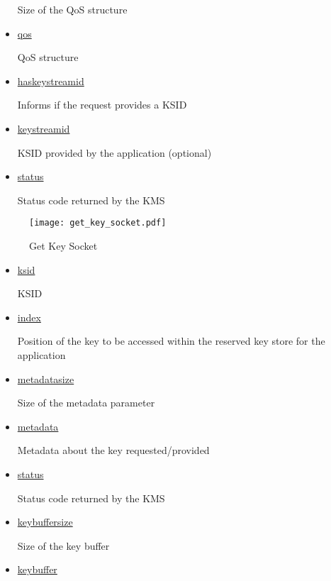 \begin{refsection}
\begin{itemize}
		Size of the QoS structure

	\item\underline{qos}

		QoS structure

	\item\underline{has\textunderscore key\textunderscore stream\textunderscore id}

		Informs if the request provides a KSID

	\item\underline{key\textunderscore stream\textunderscore id}

		KSID provided by the application (optional)

	\item\underline{status}

		Status code returned by the KMS

\end{itemize}

\begin{figure}[H]
	\centering
	\texttt{[image: get\_key\_socket.pdf]}
	\caption{Get Key Socket}
	\label{fig:getKey}
\end{figure}

\begin{itemize}

	\item\underline{ksid}

		KSID

	\item\underline{index}

		Position of the key to be accessed within the reserved key store for the application

	\item\underline{metadata\textunderscore size}

		Size of the metadata parameter

	\item\underline{metadata}

		Metadata about the key requested/provided

	\item\underline{status}

		Status code returned by the KMS

	\item\underline{key\textunderscore buffer\textunderscore size}

		Size of the key buffer

	\item\underline{key\textunderscore buffer}


\end{itemize}
\end{refsection}
